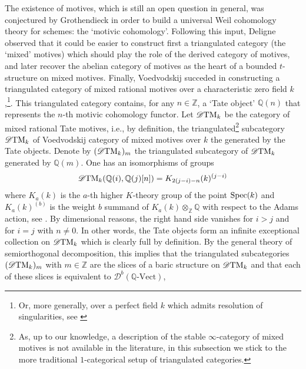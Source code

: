 \documentclass{article}
\theoremstyle{definition}
\newcommand{\Z}{\mathbb{Z}}
\begin{document}
The existence of motives, which is still an open question in general, was conjectured by Grothendieck in order to build a universal Weil cohomology theory for schemes: the `motivic cohomology'. Following this input, Deligne observed that it could be easier to construct first a triangulated category (the `mixed' motives) which should play the role of the derived category of motives, and later recover the abelian category of motives as the heart of a bounded $t$-structure on mixed motives. Finally, Voedvodskij succeded in constructing a triangulated category of mixed rational motives over a characteristic zero field $k$,\footnote{Or, more generally, over a perfect field $k$ which admits resolution of singularities, see \cite{friedlander-voedvosky-bivariant}}. This triangulated category contains, for any $n \in \Z$, a `Tate object' $\mathbb{Q}(n)$ that represents the $n$-th motivic cohomology functor. Let $\mathscr{D}\textnormal{TM}_k$ be the category of mixed rational Tate motives, i.e., by definition, the triangulated\footnote{As, up to our knowledge, a description of the stable $\infty$-category of mixed motives is not available in the literature, in this subsection we stick to the more traditional $1$-categorical setup of triangulated categories.} subcategory $\mathscr{D}\textnormal{TM}_k$ of Voedvodskij category of mixed motives over $k$ the generated by the Tate objects.  Denote by $(\mathscr{D}\textnormal{TM}_k)_{m}$ the triangulated subcategory of $\mathscr{D}\textnormal{TM}_k$ generated by $\mathbb{Q}(m)$. One has an isomorphisms of groups
  \[
   \mathscr{D}\textnormal{TM}_k(\mathbb{Q}(i),\mathbb{Q}(j)[n])=K_{2(j-i)-n}(k)^{(j-i)}
   \]
   where $K_a(k)$ is the $a$-th higher $K$-theory group of the point $\textnormal{Spec}(k)$ and $K_a(k)^{(b)}$ is the weight $b$ summand of $K_a(k) \otimes_{\mathbb{Z}} \mathbb{Q}$ with respect to the Adams action, see \cite{???}. %
  By dimensional reasons, the right hand side vanishes for $i > j$ and for $i = j$ with $n \neq 0$. In other words, the Tate objects form an infinite exceptional collection on $\mathscr{D}\textnormal{TM}_k$ which is clearly full by definition. By the general theory of semiorthogonal decomposition, this implies that the triangulated subcategories $(\mathscr{D}\textnormal{TM}_k)_{m}$ with $m\in \Z$ are the slices of a baric structure on $\mathscr{D}\textnormal{TM}_k$ and that each of these slices is equivalent to $\mathscr{D}^b(\mathbb{Q}\text{-Vect})$,
\end{document}
